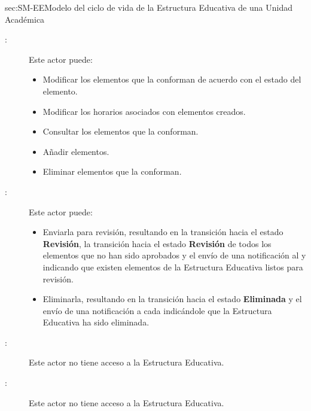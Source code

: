 \begin{Maquina}{sec:SM-EE}{Modelo del ciclo de vida de la Estructura Educativa de una Unidad Académica}
\begin{description}
\begin{description}
	\item[:] Este actor puede:
	\begin{itemize} 
		\item Modificar los elementos que la conforman de acuerdo con el estado del elemento.
		\item Modificar los horarios asociados con elementos creados.
		\item Consultar los elementos que la conforman.
		\item Añadir elementos.
		\item Eliminar elementos que la conforman.
	\end{itemize}
	
	
	\item[:] Este actor puede:
	\begin{itemize} 
		
		\item Enviarla para revisión, resultando en la transición hacia el estado {\bf Revisión}, la transición hacia el estado {\bf Revisión} de todos los elementos que no han sido aprobados y el envío de una notificación al  y  indicando que existen elementos de la Estructura Educativa listos para revisión.
		
		\item Eliminarla, resultando en la transición hacia el estado {\bf Eliminada} y el envío de una notificación a cada  indicándole que la Estructura Educativa ha sido eliminada.
	\end{itemize}	
	
	\item[:] Este actor no tiene acceso a la Estructura Educativa.
	
	\item[:] Este actor no tiene acceso a la Estructura Educativa.
	
\end{description}


\end{description}
\end{Maquina}
